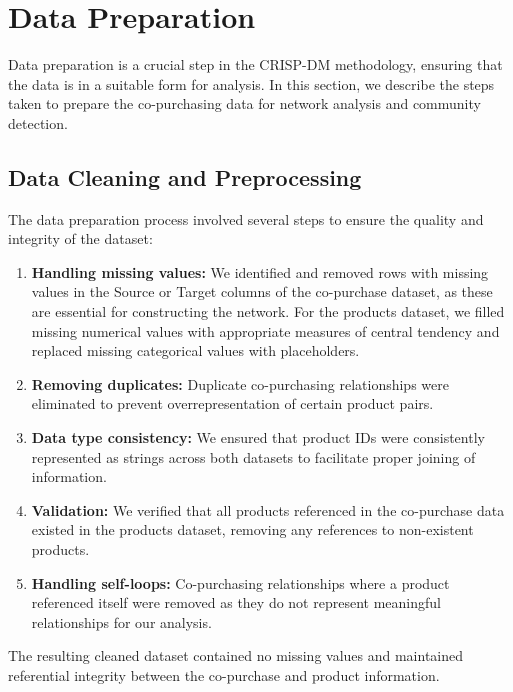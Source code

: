 \documentclass[conference]{IEEEtran}
\begin{document}
\section{Data Preparation}
Data preparation is a crucial step in the CRISP-DM methodology, ensuring that the data is in a suitable form for analysis. In this section, we describe the steps taken to prepare the co-purchasing data for network analysis and community detection.

\subsection{Data Cleaning and Preprocessing}
The data preparation process involved several steps to ensure the quality and integrity of the dataset:

\begin{enumerate}
    \item \textbf{Handling missing values:} We identified and removed rows with missing values in the Source or Target columns of the co-purchase dataset, as these are essential for constructing the network. For the products dataset, we filled missing numerical values with appropriate measures of central tendency and replaced missing categorical values with placeholders.
    
    \item \textbf{Removing duplicates:} Duplicate co-purchasing relationships were eliminated to prevent overrepresentation of certain product pairs.
    
    \item \textbf{Data type consistency:} We ensured that product IDs were consistently represented as strings across both datasets to facilitate proper joining of information.
    
    \item \textbf{Validation:} We verified that all products referenced in the co-purchase data existed in the products dataset, removing any references to non-existent products.
    
    \item \textbf{Handling self-loops:} Co-purchasing relationships where a product referenced itself were removed as they do not represent meaningful relationships for our analysis.
\end{enumerate}

The resulting cleaned dataset contained no missing values and maintained referential integrity between the co-purchase and product information.
\end{document}
